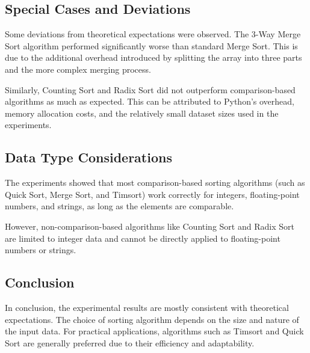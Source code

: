 \documentclass{article}
\begin{document}
\subsection{Special Cases and Deviations}

Some deviations from theoretical expectations were observed. The 3-Way Merge Sort algorithm performed significantly worse than standard Merge Sort. This is due to the additional overhead introduced by splitting the array into three parts and the more complex merging process.

Similarly, Counting Sort and Radix Sort did not outperform comparison-based algorithms as much as expected. This can be attributed to Python's overhead, memory allocation costs, and the relatively small dataset sizes used in the experiments.

\subsection{Data Type Considerations}

The experiments showed that most comparison-based sorting algorithms (such as Quick Sort, Merge Sort, and Timsort) work correctly for integers, floating-point numbers, and strings, as long as the elements are comparable.

However, non-comparison-based algorithms like Counting Sort and Radix Sort are limited to integer data and cannot be directly applied to floating-point numbers or strings.

\subsection{Conclusion}

In conclusion, the experimental results are mostly consistent with theoretical expectations. The choice of sorting algorithm depends on the size and nature of the input data. For practical applications, algorithms such as Timsort and Quick Sort are generally preferred due to their efficiency and adaptability.
\end{document}
